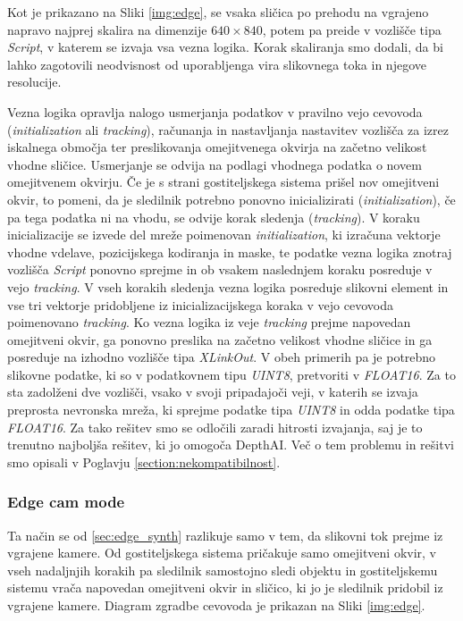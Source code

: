 \documentclass[a4paper,12pt,openright]{book}
\begin{document}
Kot je prikazano na Sliki \ref{img:edge}, se vsaka sličica po prehodu na vgrajeno napravo najprej skalira na dimenzije $ 640 \times 840 $, potem pa preide v vozlišče tipa \emph{Script}, v katerem se izvaja vsa vezna logika. Korak skaliranja smo dodali, da bi lahko zagotovili neodvisnost od uporabljenga vira slikovnega toka in njegove resolucije.

Vezna logika opravlja nalogo usmerjanja podatkov v pravilno vejo cevovoda (\emph{initialization} ali \emph{tracking}), računanja in nastavljanja nastavitev vozlišča za izrez iskalnega območja ter preslikovanja omejitvenega okvirja na začetno velikost vhodne sličice. Usmerjanje se odvija na podlagi vhodnega podatka o novem omejitvenem okvirju. Če je s strani gostiteljskega sistema prišel nov omejitveni okvir, to pomeni, da je sledilnik potrebno ponovno inicializirati (\emph{initialization}), če pa tega podatka ni na vhodu, se odvije korak sledenja (\emph{tracking}). V koraku inicializacije se izvede del mreže poimenovan \emph{initialization}, ki izračuna vektorje vhodne vdelave, pozicijskega kodiranja in maske, te podatke vezna logika znotraj vozlišča \emph{Script} ponovno sprejme in ob vsakem naslednjem koraku posreduje v vejo \emph{tracking}. V vseh korakih sledenja vezna logika posreduje slikovni element in vse tri vektorje pridobljene iz inicializacijskega koraka v vejo cevovoda poimenovano \emph{tracking}. Ko vezna logika iz veje \emph{tracking} prejme napovedan omejitveni okvir, ga ponovno preslika na začetno velikost vhodne sličice in ga posreduje na izhodno vozlišče tipa \emph{XLinkOut}. V obeh primerih pa je potrebno slikovne podatke, ki so v podatkovnem tipu \emph{UINT8}, pretvoriti v \emph{FLOAT16}. Za to sta zadolženi dve vozlišči, vsako v svoji pripadajoči veji, v katerih se izvaja preprosta nevronska mreža, ki sprejme podatke tipa \emph{UINT8} in odda podatke tipa \emph{FLOAT16}. Za tako rešitev smo se odločili zaradi hitrosti izvajanja, saj je to trenutno najboljša rešitev, ki jo omogoča DepthAI. Več o tem problemu in rešitvi smo opisali v Poglavju \ref{section:nekompatibilnost}.



\subsubsection{Edge cam mode}
\label{sec:edge_cam}
Ta način se od \ref{sec:edge_synth} razlikuje samo v tem, da slikovni tok prejme iz vgrajene kamere. Od gostiteljskega sistema pričakuje samo omejitveni okvir, v vseh nadaljnjih korakih pa sledilnik samostojno sledi objektu in gostiteljskemu sistemu vrača napovedan omejitveni okvir in sličico, ki jo je sledilnik pridobil iz vgrajene kamere. Diagram zgradbe cevovoda je prikazan na Sliki \ref{img:edge}.
\end{document}
